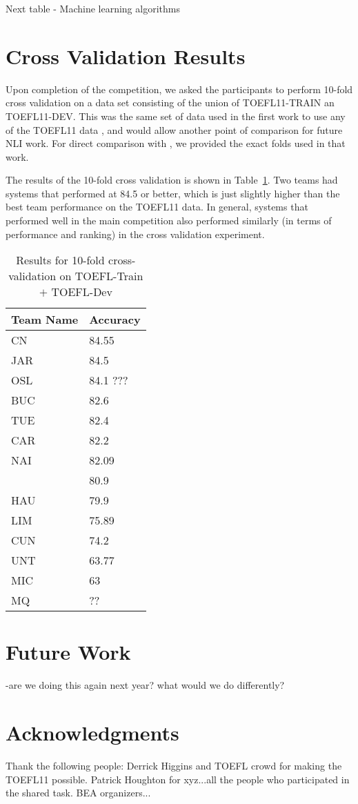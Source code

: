 \documentclass[11pt,letterpaper]{article}
\begin{document}
Next table - Machine learning algorithms


\section{Cross Validation Results}
Upon completion of the competition, we asked the participants to
perform 10-fold cross validation on a data set consisting of the union
of TOEFL11-TRAIN an TOEFL11-DEV.  This was the same set of data
used in the first work to use any of the TOEFL11 data
\cite{tetreault-EtAl:2012:PAPERS}, and would allow another point of
comparison for future NLI work.  For direct comparison with
\cite{tetreault-EtAl:2012:PAPERS}, we provided the exact folds used in
that work.

The results of the 10-fold cross validation is shown in Table~\ref{tab:10fold}.
Two teams had systems that performed at 84.5 or better, which is just
slightly higher than the best team performance on the TOEFL11 data.  In
general, systems that performed well in the main competition also
performed similarly (in terms of performance and ranking) in the
cross validation experiment.


\begin{table}[htbp]
\begin{tabular}{|l|l|}
\hline
Team Name & Accuracy\\ \hline
CN & 84.55 \\ \hline
JAR & 84.5 \\ \hline
OSL & 84.1 ???\\ \hline
BUC & 82.6 \\ \hline
TUE & 82.4 \\ \hline
CAR & 82.2 \\ \hline
NAI & 82.09 \\ \hline
\cite{tetreault-EtAl:2012:PAPERS} &  80.9 \\ \hline
HAU & 79.9 \\ \hline
LIM & 75.89  \\ \hline
CUN & 74.2\\ \hline
UNT  & 63.77 \\ \hline
MIC & 63 \\ \hline
MQ  & ?? \\ \hline

\end{tabular}
\caption{Results for 10-fold cross-validation on TOEFL-Train $+$ TOEFL-Dev \label{tab:10fold}}
\end{table}

\section{Future Work} -are we doing this again next year?  what would we do differently?


\section*{Acknowledgments}

Thank the following people:  Derrick Higgins and TOEFL crowd for
making the TOEFL11 possible.  Patrick Houghton for xyz...all the people
who participated in the shared task.  BEA organizers...





\end{document}
